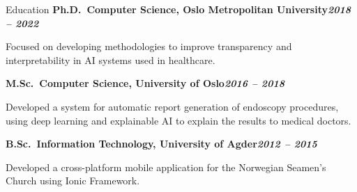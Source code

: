 \begin{rubric}{Education}
\entry*[]%
\textbf{Ph.D.~Computer Science, Oslo Metropolitan University\hfill\textit{2018 -- 2022}} \par
\begin{compactitem}
    \item Focused on developing methodologies to improve transparency and interpretability in AI systems used in healthcare.
    \vspace{-12pt}
\end{compactitem}
%
\entry*[]%
\textbf{M.Sc.~Computer Science, University of Oslo\hfill\textit{2016 -- 2018}} \par
\begin{compactitem}
    \item Developed a system for automatic report generation of endoscopy procedures, using deep learning and explainable AI to explain the results to medical doctors.
    \vspace{-12pt}
\end{compactitem}
% 
\entry*[]%
\textbf{B.Sc.~Information Technology, University of Agder\hfill\textit{2012 -- 2015}} \par
\begin{compactitem}
\item Developed a cross-platform mobile application for the Norwegian Seamen's Church using Ionic Framework.
\end{compactitem}
\end{rubric}